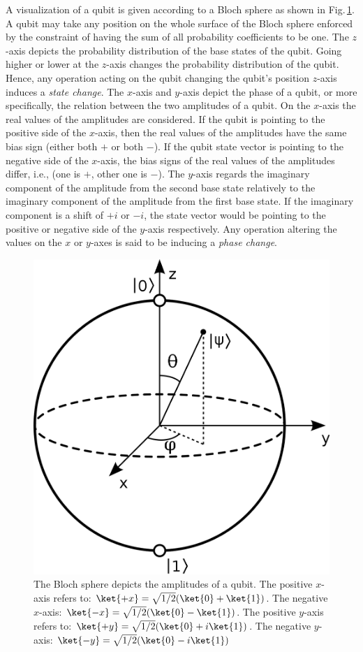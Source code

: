 \documentclass[../main.tex]{subfiles}
\begin{document}
A visualization of a qubit is given according to a Bloch sphere as shown in Fig.\,\ref{fig: bloch_sphere}. A qubit may take any position on the whole surface of the Bloch sphere enforced by the constraint of having the sum of all probability coefficients to be one. The $z$-axis depicts the probability distribution of the base states of the qubit. Going higher or lower at the $z$-axis changes the probability distribution of the qubit. Hence, any operation acting on the qubit changing the qubit's position $z$-axis induces a \emph{state change}. The $x$-axis and $y$-axis depict the phase of a qubit, or more specifically, the relation between the two amplitudes of a qubit. On the $x$-axis the real values of the amplitudes are considered. If the qubit is pointing to the positive side of the $x$-axis, then the real values of the amplitudes have the same bias sign (either both $+$ or both $-$). If the qubit state vector is pointing to the negative side of the $x$-axis, the bias signs of the real values of the amplitudes differ, i.e., (one is $+$, other one is $-$). The $y$-axis regards the imaginary component of the amplitude from the second base state relatively to the imaginary component of the amplitude from the first base state. If the imaginary component is a shift of $+i$ or $-i$, the state vector would be pointing to the positive or negative side of the $y$-axis respectively. Any operation altering the values on the $x$ or $y$-axes is said to be inducing a \emph{phase change}.
\begin{figure}[H]
    \begin{center}
      \includegraphics[width=0.5\linewidth]{../../images/bloch_sphere.png}
    \end{center}
    \caption{The Bloch sphere depicts the amplitudes of a qubit. The positive $x$-axis refers to: $\ket{+x} = \sqrt{1/2}(\ket{0} + \ket{1})$. The negative $x$-axis: $\ket{-x} = \sqrt{1/2}(\ket{0} - \ket{1})$. The positive $y$-axis refers to: $\ket{+y} = \sqrt{1/2}(\ket{0} + i \ket{1})$. The negative $y$-axis: $\ket{-y} = \sqrt{1/2}(\ket{0} - i \ket{1})$}
    \label{fig: bloch_sphere}
\end{figure} 
\end{document}
